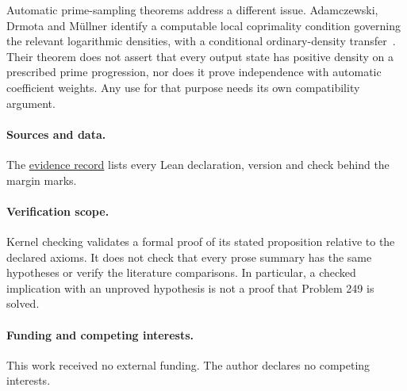 Automatic prime-sampling theorems address a different issue.
Adamczewski, Drmota and M\"ullner identify a computable local coprimality
condition governing the relevant logarithmic densities, with a conditional
ordinary-density transfer~\cite[Thm.~1.4 and Rem.~1.5]{adamczewski-drmota-mullner}.
Their theorem does not assert that every output state has positive density
on a prescribed prime progression, nor does it prove independence with
automatic coefficient weights. Any use for that purpose needs its own
compatibility argument.

\paragraph{Sources and data.} The \href{\evidencerecordurl}{evidence record}
lists every Lean declaration, version and check behind the margin marks.

\paragraph{Verification scope.} Kernel checking validates a formal proof of
its stated proposition relative to the declared axioms. It does not check
that every prose summary has the same hypotheses or verify the literature
comparisons. In particular, a checked implication with an unproved
hypothesis is not a proof that Problem 249 is solved.

\paragraph{Funding and competing interests.} This work received no external
funding. The author declares no competing interests.

